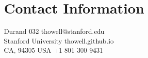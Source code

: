 \section{\sc Contact Information}
 Durand 032     \hfill thowell@stanford.edu\\
 Stanford University  \hfill thowell.github.io\\
 CA, 94305 USA \hfill +1 801 300 9431

